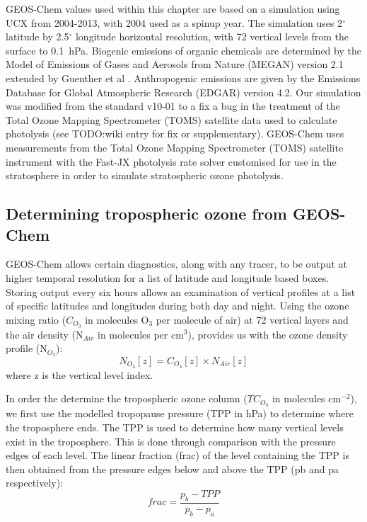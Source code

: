   GEOS-Chem values used within this chapter are based on a simulation using UCX from 2004-2013, with 2004 used as a spinup year.
  The simulation uses 2$^{\circ}$ latitude by 2.5$^{\circ}$ longitude horizontal resolution, with 72 vertical levels from the surface to 0.1~hPa.
  Biogenic emissions of organic chemicals are determined by the Model of Emissions of Gases and Aerosols from Nature (MEGAN) version 2.1 extended by Guenther et al \citep{Guenther2012}.
  Anthropogenic emissions are given by the Emissions Database for Global Atmospheric Research (EDGAR) version 4.2.
  Our simulation was modified from the standard v10-01 to a fix a bug in the treatment of the Total Ozone Mapping Spectrometer (TOMS) satellite data used to calculate photolysis (see TODO:wiki entry for fix or supplementary).
  GEOS-Chem uses measurements from the Total Ozone Mapping Spectrometer (TOMS) satellite instrument with the Fast-JX photolysis rate solver customised for use in the stratosphere in order to simulate stratospheric ozone photolysis.
    
  \subsection{Determining tropospheric ozone from GEOS-Chem}
    GEOS-Chem allows certain diagnostics, along with any tracer, to be output at higher temporal resolution for a list of latitude and longitude based boxes.
    Storing output every six hours allows an examination of vertical profiles at a list of specific latitudes and longitudes during both day and night.
    Using the ozone mixing ratio ($C_{O_3}$ in molecules O$_3$ per molecule of air) at 72 vertical layers and the air density (N$_{Air}$ in molecules per cm$^3$), provides us with the ozone density profile (N$_{O_3}$):
    \begin{equation*}
     N_{O_3}[z] = C_{O_3}[z] \times N_{Air}[z]
    \end{equation*}
    where z is the vertical level index.
    
    In order the determine the tropospheric ozone column ($TC_{O_3}$ in molecules cm$^{-2}$), we first use the modelled tropopause pressure (TPP in hPa) to determine where the troposphere ends.
    The TPP is used to determine how many vertical levels exist in the troposphere.
    This is done through comparison with the pressure edges of each level.
    The linear fraction (frac) of the level containing the TPP is then obtained from the pressure edges below and above the TPP (pb and pa respectively):
    \begin{equation*}
     frac = \frac{p_b - TPP}{p_b-p_a}
    \end{equation*}
    
